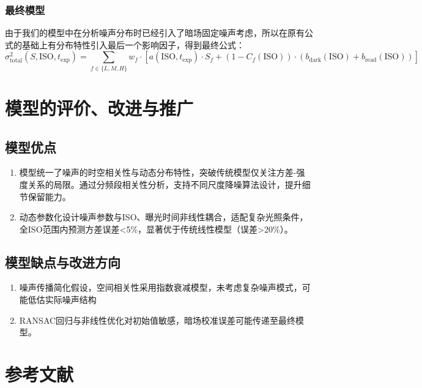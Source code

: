 \documentclass[a4paper]{article}
\begin{document}
	\subsubsection{最终模型}
	由于我们的模型中在分析噪声分布时已经引入了暗场固定噪声考虑，所以在原有公式的基础上有分布特性引入最后一个影响因子，得到最终公式：
	$$
	\sigma^2_{\text{total}}(S, \text{ISO}, t_{\text{exp}}) = \sum_{f\in\{L,M,H\}}w_{f}\cdot\left[a(\text{ISO},t_{\text{exp}})\cdot S_{f}+(1-C_{f}(\text{ISO}))\cdot(b_{\text{dark}}(\text{ISO})+b_{\text{read}}(\text{ISO}))\right]
	$$

	\section{模型的评价、改进与推广}
	\subsection{模型优点}
	\begin{enumerate}
		\item 模型统一了噪声的时空相关性与动态分布特性，突破传统模型仅关注方差-强度关系的局限。通过分频段相关性分析，支持不同尺度降噪算法设计，提升细节保留能力。
		\item 动态参数化设计噪声参数与ISO、曝光时间非线性耦合，适配复杂光照条件，全ISO范围内预测方差误差<5\%，显著优于传统线性模型（误差>20\%）。
	\end{enumerate}
	

	\subsection{模型缺点与改进方向}
		\begin{enumerate}
		\item 噪声传播简化假设，空间相关性采用指数衰减模型，未考虑复杂噪声模式，可能低估实际噪声结构
		\item RANSAC回归与非线性优化对初始值敏感，暗场校准误差可能传递至最终模型。
	\end{enumerate}


\section*{参考文献}
\end{document}
